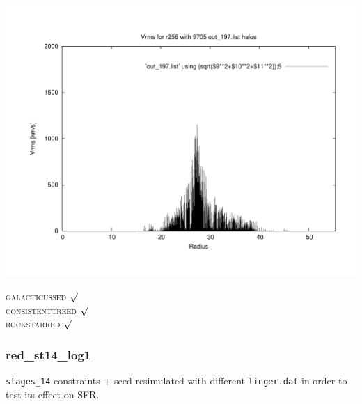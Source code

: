 \includegraphics[scale=0.3]{r256/h70/mm_h/plot_Vrms_out_197.pdf}





\textsc{galacticussed} $\surd$ \\
\textsc{consistenttreed} $\surd$ \\
\textsc{rockstarred} $\surd$ \\

% 
%
%
%
%
%
%
%

\newpage

\subsubsection{red\_st14\_log1}
\texttt{stages\_14} constraints + seed resimulated with different \texttt{linger.dat} in order
to test its effect on SFR. 

